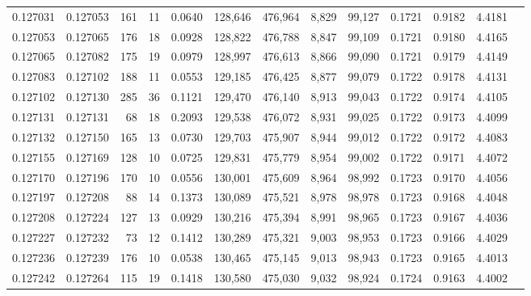 \begin{tabular}{rrrrrrrrrrrrr}
0.127031 & 0.127053 &   161 &  11 &                                     0.0640 & 128,646 & 476,964 &   8,829 &  99,127 & 0.1721 & 0.9182 & 4.4181 \\
0.127053 & 0.127065 &   176 &  18 &                                     0.0928 & 128,822 & 476,788 &   8,847 &  99,109 & 0.1721 & 0.9180 & 4.4165 \\
0.127065 & 0.127082 &   175 &  19 &                                     0.0979 & 128,997 & 476,613 &   8,866 &  99,090 & 0.1721 & 0.9179 & 4.4149 \\
0.127083 & 0.127102 &   188 &  11 &                                     0.0553 & 129,185 & 476,425 &   8,877 &  99,079 & 0.1722 & 0.9178 & 4.4131 \\
0.127102 & 0.127130 &   285 &  36 &                                     0.1121 & 129,470 & 476,140 &   8,913 &  99,043 & 0.1722 & 0.9174 & 4.4105 \\
0.127131 & 0.127131 &    68 &  18 &                                     0.2093 & 129,538 & 476,072 &   8,931 &  99,025 & 0.1722 & 0.9173 & 4.4099 \\
0.127132 & 0.127150 &   165 &  13 &                                     0.0730 & 129,703 & 475,907 &   8,944 &  99,012 & 0.1722 & 0.9172 & 4.4083 \\
0.127155 & 0.127169 &   128 &  10 &                                     0.0725 & 129,831 & 475,779 &   8,954 &  99,002 & 0.1722 & 0.9171 & 4.4072 \\
0.127170 & 0.127196 &   170 &  10 &                                     0.0556 & 130,001 & 475,609 &   8,964 &  98,992 & 0.1723 & 0.9170 & 4.4056 \\
0.127197 & 0.127208 &    88 &  14 &                                     0.1373 & 130,089 & 475,521 &   8,978 &  98,978 & 0.1723 & 0.9168 & 4.4048 \\
0.127208 & 0.127224 &   127 &  13 &                                     0.0929 & 130,216 & 475,394 &   8,991 &  98,965 & 0.1723 & 0.9167 & 4.4036 \\
0.127227 & 0.127232 &    73 &  12 &                                     0.1412 & 130,289 & 475,321 &   9,003 &  98,953 & 0.1723 & 0.9166 & 4.4029 \\
0.127236 & 0.127239 &   176 &  10 &                                     0.0538 & 130,465 & 475,145 &   9,013 &  98,943 & 0.1723 & 0.9165 & 4.4013 \\
0.127242 & 0.127264 &   115 &  19 &                                     0.1418 & 130,580 & 475,030 &   9,032 &  98,924 & 0.1724 & 0.9163 & 4.4002 \\

\end{tabular}

